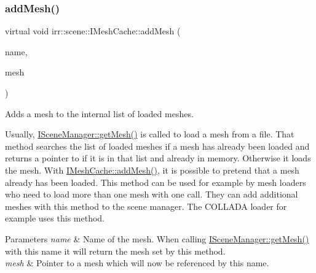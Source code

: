 \subsubsection{\texorpdfstring{add\+Mesh()}{addMesh()}\hspace{0.1cm}{\footnotesize\ttfamily [1/2]}}
{\footnotesize\ttfamily virtual void irr\+::scene\+::\+I\+Mesh\+Cache\+::add\+Mesh (\begin{DoxyParamCaption}\item[{const \hyperlink{namespaceirr_1_1io_a6468281622ce3a1c46b72e19f32dded5}{io\+::path} \&}]{name,  }\item[{\hyperlink{classirr_1_1scene_1_1IAnimatedMesh}{I\+Animated\+Mesh} $\ast$}]{mesh }\end{DoxyParamCaption})\hspace{0.3cm}{\ttfamily [pure virtual]}}



Adds a mesh to the internal list of loaded meshes. 

Usually, \hyperlink{classirr_1_1scene_1_1ISceneManager_a63894c3f3d46cfc385116f1705935e03}{I\+Scene\+Manager\+::get\+Mesh()} is called to load a mesh from a file. That method searches the list of loaded meshes if a mesh has already been loaded and returns a pointer to if it is in that list and already in memory. Otherwise it loads the mesh. With \hyperlink{classirr_1_1scene_1_1IMeshCache_a2959812a3a393817b1db42761766c49b}{I\+Mesh\+Cache\+::add\+Mesh()}, it is possible to pretend that a mesh already has been loaded. This method can be used for example by mesh loaders who need to load more than one mesh with one call. They can add additional meshes with this method to the scene manager. The C\+O\+L\+L\+A\+DA loader for example uses this method. 
\begin{DoxyParams}{Parameters}
{\em name} & Name of the mesh. When calling \hyperlink{classirr_1_1scene_1_1ISceneManager_a63894c3f3d46cfc385116f1705935e03}{I\+Scene\+Manager\+::get\+Mesh()} with this name it will return the mesh set by this method. \\
\hline
{\em mesh} & Pointer to a mesh which will now be referenced by this name. \\
\hline
\end{DoxyParams}
\mbox{\label{classirr_1_1scene_1_1IMeshCache_a2959812a3a393817b1db42761766c49b}} 
